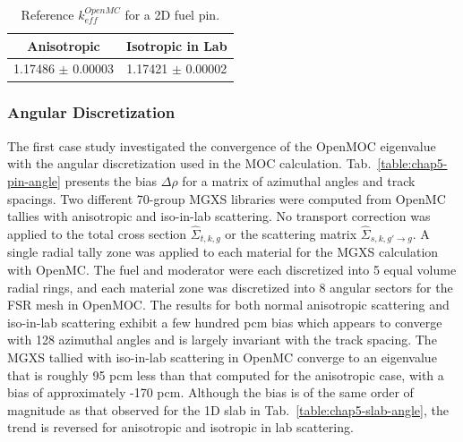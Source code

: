 \begin{table}[h!]
  \centering
  \caption[Reference OpenMC eigenvalues for a 2D fuel pin]{Reference $k^{OpenMC}_{eff}$ for a 2D fuel pin.}
  \label{table:chap5-pin-reference} 
  \vspace{6pt}
  \begin{tabular}{c c}
  \toprule
  \rowcolor{lightgray}
  {\cellcolor{carolinablue} {\bf Anisotropic}} &
  {\cellcolor{lightgreen} {\bf Isotropic in Lab}} \\
  \midrule
  1.17486 $\pm$ 0.00003 & 1.17421 $\pm$ 0.00002 \\
  \bottomrule
\end{tabular}
\end{table}

\subsubsection{Angular Discretization}
\label{subsubsec:chap5-pin-angle}

The first case study investigated the convergence of the OpenMOC eigenvalue with the angular discretization used in the \ac{MOC} calculation. Tab.~\ref{table:chap5-pin-angle} presents the bias $\Delta\rho$ for a matrix of azimuthal angles and track spacings. Two different 70-group \ac{MGXS} libraries were computed from OpenMC tallies with anisotropic and iso-in-lab scattering. No transport correction was applied to the total cross section $\hat{\Sigma}_{t,k,g}$ or the scattering matrix $\hat{\Sigma}_{s,k,g'\rightarrow g}$. A single radial tally zone was applied to each material for the \ac{MGXS} calculation with OpenMC. The fuel and moderator were each discretized into 5 equal volume radial rings, and each material zone was discretized into 8 angular sectors for the \ac{FSR} mesh in OpenMOC. The results for both normal anisotropic scattering and iso-in-lab scattering exhibit a few hundred \ac{pcm} bias which appears to converge with 128 azimuthal angles and is largely invariant with the track spacing. The \ac{MGXS} tallied with iso-in-lab scattering in OpenMC converge to an eigenvalue that is roughly 95 \ac{pcm} less than that computed for the anisotropic case, with a bias of approximately -170 pcm. Although the bias is of the same order of magnitude as that observed for the 1D slab in Tab.~\ref{table:chap5-slab-angle}, the trend is reversed for anisotropic and isotropic in lab scattering.


